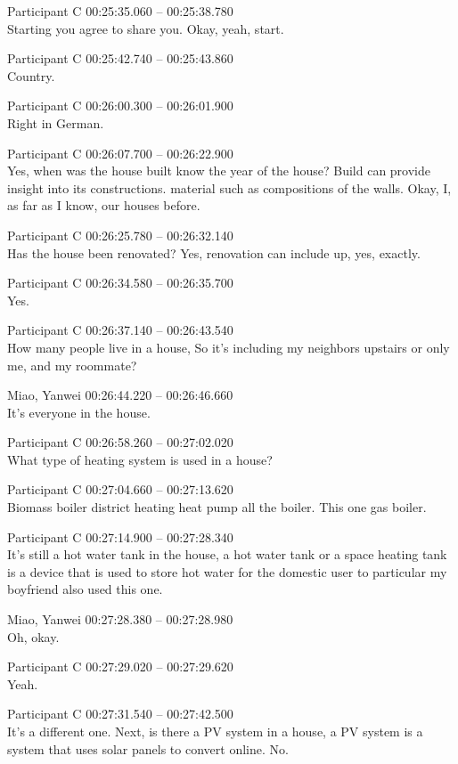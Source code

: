 {Participant C 00:25:35.060 -- 00:25:38.780 \\
Starting you agree to share you. Okay, yeah, start.

Participant C 00:25:42.740 -- 00:25:43.860 \\
Country.

Participant C 00:26:00.300 -- 00:26:01.900 \\
Right in German.

Participant C 00:26:07.700 -- 00:26:22.900 \\
Yes, when was the house built know the year of the house? Build can provide insight into its constructions. material such as compositions of the walls. Okay, I, as far as I know, our houses before.

Participant C 00:26:25.780 -- 00:26:32.140 \\
Has the house been renovated? Yes, renovation can include up, yes, exactly.

Participant C 00:26:34.580 -- 00:26:35.700 \\
Yes.

Participant C 00:26:37.140 -- 00:26:43.540 \\
How many people live in a house, So it's including my neighbors upstairs or only me, and my roommate?

Miao, Yanwei 00:26:44.220 -- 00:26:46.660 \\
It's everyone in the house.

Participant C 00:26:58.260 -- 00:27:02.020 \\
What type of heating system is used in a house?

Participant C 00:27:04.660 -- 00:27:13.620 \\
Biomass boiler district heating heat pump all the boiler. This one gas boiler.

Participant C 00:27:14.900 -- 00:27:28.340 \\
It's still a hot water tank in the house, a hot water tank or a space heating tank is a device that is used to store hot water for the domestic user to particular my boyfriend also used this one.

Miao, Yanwei 00:27:28.380 -- 00:27:28.980 \\
Oh, okay.

Participant C 00:27:29.020 -- 00:27:29.620 \\
Yeah.

Participant C 00:27:31.540 -- 00:27:42.500 \\
It's a different one. Next, is there a PV system in a house, a PV system is a system that uses solar panels to convert online. No.

}
